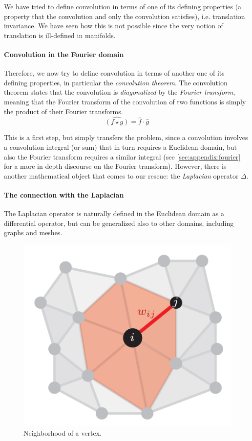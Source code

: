 
We have tried to define convolution in terms of one of its defining properties (a property that the convolution and only the convolution satisfies), i.e. translation invariance. We have seen how this is not possible since the very notion of translation is ill-defined in manifolds.

\paragraph{Convolution in the Fourier domain}

Therefore, we now try to define convolution in terms of another one of its defining properties, in particular the \emph{convolution theorem}. The convolution theorem states that the convolution is \emph{diagonalized} by the \emph{Fourier transform}, meaning that the Fourier transform of the convolution of two functions is simply the product of their Fourier transforms.
\begin{equation}
    \widehat{\left( f \star g \right)} = \hat{f} \cdot \hat{g}
\end{equation}

This is a first step, but simply transfers the problem, since a convolution involves a convolution integral (or sum) that in turn requires a Euclidean domain, but also the Fourier transform requires a similar integral (see \cref{sec:appendix:fourier} for a more in depth discourse on the Fourier transform). However, there is another mathematical object that comes to our rescue: the \emph{Laplacian} operator $\Delta$.

\paragraph{The connection with the Laplacian}
The Laplacian operator is naturally defined in the Euclidean domain as a differential operator, but can be generalized also to other domains, including graphs and meshes. 

\begin{figure}[H]
    \centering
    \includegraphics[width=.4\textwidth]{figures/12/laplacian.png}
    \caption{Neighborhood of a vertex.}
\end{figure}

